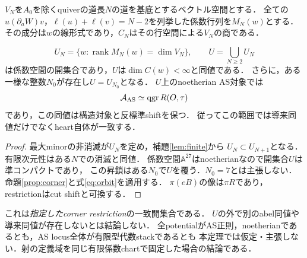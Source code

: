 $V_N$を$A_0$を除くquiverの道長$N$の道を基底とするベクトル空間とする．
全ての$u(\partial_aW)v$，$\ell(u)+\ell(v)=N-2$を列挙した係数行列を$M_N(w)$とする．
その成分は$w$の線形式であり，$C_N$はその行空間による$V_N$の商である．
\begin{theorem}\label{thm:open}
\[
 U_N=\{w:\operatorname{rank}M_N(w)=\dim V_N\},\qquad
 U=\bigcup_{N\ge2}U_N
\]
は係数空間の開集合であり，$U$は$\dim C(w)<\infty$と同値である．
さらに，ある一様な整数$N_0$が存在し$U=U_{N_0}$となる．
$U$上のnoetherian AS対象では
\[
 \mathcal A_{\mathrm{AS}}\simeq\operatorname{qgr} R(O,\tau)
\]
であり，この同値は構造対象と反標準shiftを保つ．
従ってこの範囲では導来同値だけでなくheart自体が一致する．
\end{theorem}
\begin{proof}
最大minorの非消滅が$U_N$を定め，補題\ref{lem:finite}から
$U_N\subset U_{N+1}$となる．有限次元性はある$N$での消滅と同値．
係数空間$\mathbb A^{27}$はnoetherianなので開集合$U$は準コンパクトであり，
この昇鎖はある$N_0$で$U$を覆う．$N_0=7$とは主張しない．
命題\ref{prop:corner}と式\eqref{eq:orbit}を適用する．
$\pi(eB)$の像は$\pi R$であり，restrictionはcut shiftと可換する．
\end{proof}

\begin{remark}
これは\emph{指定したcorner restriction}の一致開集合である．
$U$の外で別のabel同値や導来同値が存在しないとは結論しない．
全potentialがAS正則，noetherianであるとも，AS locus全体が有限型代数stackであるとも
本定理では仮定・主張しない．射の定義域を同じ有限係数chartで固定した場合の結論である．
\end{remark}


